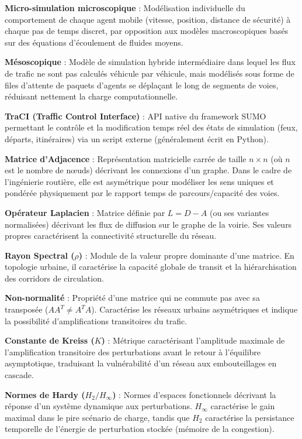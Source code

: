 \documentclass[10pt, a4paper]{article}
\begin{document}
\textbf{Micro-simulation microscopique} : Modélisation individuelle du
comportement de chaque agent mobile (vitesse, position, distance de
sécurité) à chaque pas de temps discret, par opposition aux modèles
macroscopiques basés sur des équations d'écoulement de fluides moyens.

\textbf{Mésoscopique} : Modèle de simulation hybride intermédiaire dans
lequel les flux de trafic ne sont pas calculés véhicule par véhicule,
mais modélisés sous forme de files d'attente de paquets d'agents se
déplaçant le long de segments de voies, réduisant nettement la charge
computationnelle.

\textbf{TraCI (Traffic Control Interface)} : API native du framework
SUMO permettant le contrôle et la modification temps réel des états de
simulation (feux, départs, itinéraires) via un script externe
(généralement écrit en Python).

\textbf{Matrice d'Adjacence} : Représentation matricielle carrée de
taille \(n \times n\) (où \(n\) est le nombre de nœuds) décrivant les
connexions d'un graphe. Dans le cadre de l'ingénierie routière, elle est
asymétrique pour modéliser les sens uniques et pondérée physiquement par
le rapport temps de parcours/capacité des voies.

\textbf{Opérateur Laplacien} : Matrice définie par \(L = D - A\) (ou ses
variantes normalisées) décrivant les flux de diffusion sur le graphe de
la voirie. Ses valeurs propres caractérisent la connectivité
structurelle du réseau.

\textbf{Rayon Spectral (\(\rho\))} : Module de la valeur propre
dominante d'une matrice. En topologie urbaine, il caractérise la
capacité globale de transit et la hiérarchisation des corridors de
circulation.

\textbf{Non-normalité} : Propriété d'une matrice qui ne commute pas avec
sa transposée (\(A A^T \neq A^T A\)). Caractérise les réseaux urbains
asymétriques et indique la possibilité d'amplifications transitoires du
trafic.

\textbf{Constante de Kreiss (\(K\))} : Métrique caractérisant
l'amplitude maximale de l'amplification transitoire des perturbations
avant le retour à l'équilibre asymptotique, traduisant la vulnérabilité
d'un réseau aux embouteillages en cascade.

\textbf{Normes de Hardy (\(H_2 / H_\infty\))} : Normes d'espaces
fonctionnels décrivant la réponse d'un système dynamique aux
perturbations. \(H_\infty\) caractérise le gain maximal dans le pire
scénario de charge, tandis que \(H_2\) caractérise la persistance
temporelle de l'énergie de perturbation stockée (mémoire de la
congestion).
\end{document}
